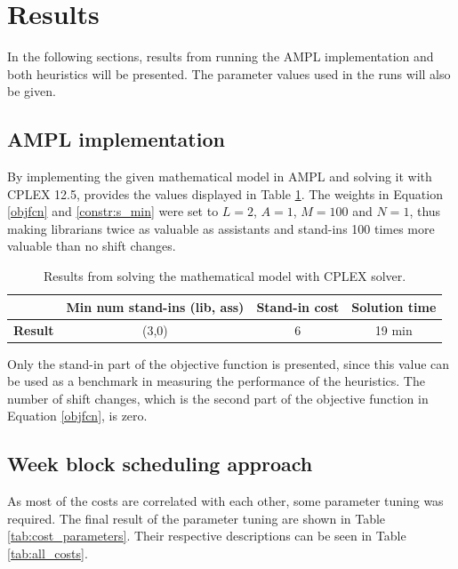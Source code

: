 \section{Results} \label{section:results}
In the following sections, results from running the AMPL implementation and both heuristics will be presented. The parameter values used in the runs will also be given. 

\subsection{AMPL implementation}\label{sec:ampl_res}

By implementing the given mathematical model in AMPL and solving it with CPLEX 12.5, provides the values displayed in Table \ref{tab:CPLEX_res}. The weights in Equation \ref{objfcn} and \ref{constr:s_min} were set to $L = 2$, $A = 1$, $M =100$ and $N=1$, thus making librarians twice as valuable as assistants and stand-ins 100 times more valuable than no shift changes. 

\begin{table}[!h]
\centering
\caption{Results from solving the mathematical model with CPLEX solver.}
\label{tab:CPLEX_res}
\begin{tabular}{|l|p{3cm}|p{3cm}|l|}
\hline
\rowcolor{Gray} & \textbf{Min num stand-ins (lib, ass)} & \textbf{Stand-in cost} & \textbf{Solution time} \\ \hline
\cellcolor{Gray} \textbf{Result} & \multicolumn{1}{c|}{(3,0)} & \multicolumn{1}{c|}{6} & \multicolumn{1}{c|}{19 min} \\
\hline
\end{tabular}
\end{table}

Only the stand-in part of the objective function is presented, since this value can be used as a benchmark in measuring the performance of the heuristics. The number of shift changes, which is the second part of the objective function in Equation \ref{objfcn}, is zero.

\subsection{Week block scheduling approach}
As most of the costs are correlated with each other, some parameter tuning was required. The final result of the parameter tuning are shown in Table \ref{tab:cost_parameters}. Their respective descriptions can be seen in Table \ref{tab:all_costs}. 

